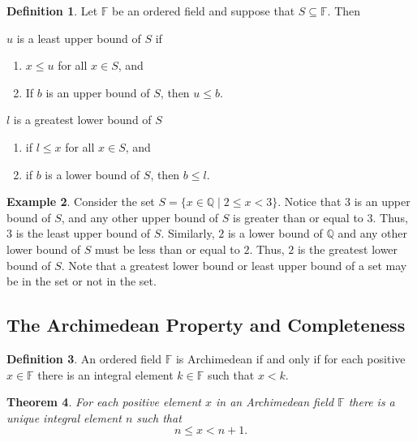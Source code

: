 \documentclass[11pt]{article}
\newtheorem{theorem}{Theorem}[section]
\theoremstyle{definition}
\newtheorem{definition}[theorem]{Definition}
\newtheorem{example}[theorem]{Example}
\begin{document}
\begin{definition}
  Let $\mathbb{F}$ be an ordered field and suppose that $S\subseteq \mathbb{F}$. Then
    \item $u$ is a least upper bound of $S$ if 
      \begin{enumerate}
        \item $x \leq u$ for all $x\in S$, and
        \item If $b$ is an upper bound of $S$, then $u\leq b$. 
      \end{enumerate}
    \item $l$ is a greatest lower bound of $S$ 
      \begin{enumerate}
        \item if $l \leq x$ for all $x\in S$, and
        \item if $b$ is a lower bound of $S$, then $b \leq l$.
      \end{enumerate}
\end{definition}

\begin{example}
  Consider the set $S = \{ x \in \mathbb{Q} \mid 2 \leq x < 3 \}$. Notice that
  $3$ is an upper bound of $S$, and any other upper bound of $S$ is greater than or 
  equal to $3$. Thus, $3$ is the least upper bound of $S$. Similarly, $2$ is a lower 
  bound of $\mathbb{Q}$ and any other lower bound of $S$ must be less than or
  equal to $2$. Thus, $2$ is the greatest lower bound of $S$.  Note that a greatest 
  lower bound or least upper bound of a set may be in the set or not in the set.
\end{example}

\subsection{The Archimedean Property and Completeness}

\begin{definition}
  An ordered field $\mathbb{F}$ is Archimedean if and only if for each positive $x\in\mathbb{F}$ there is an integral element $k\in\mathbb{F}$ such that $x < k$.
\end{definition}

\begin{theorem}
  For each positive element $x$ in an Archimedean field $\mathbb{F}$ there is a unique integral element $n$ such that
  \[ n \leq x < n + 1.\]
  \label{theorem: archimedean implies unique integral element}
\end{theorem}
\end{document}
